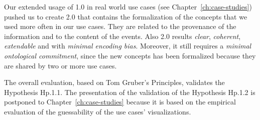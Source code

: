 Our extended usage of \frappe{} 1.0 in real world use cases (see Chapter~\ref{ch:case-studies}) pushed us to create \frappe{} 2.0 that contains the formalization of the concepts that we used more often in our use cases.
They are related to the provenance of the information and to the content of the events.
Also \frappe{} 2.0 results \textit{clear}, \textit{coherent}, \textit{extendable} and with \textit{minimal encoding bias}.
Moreover, it still requires a \textit{minimal ontological commitment}, since the new concepts has been formalized because they are shared by two or more use cases.

The overall evaluation, based on Tom Gruber's Principles, validates the Hypothesis \textsf{Hp.1.1}.
The presentation of the validation of the Hypothesis \textsf{Hp.1.2} is postponed to Chapter~\ref{ch:case-studies} because it is based on the empirical evaluation of the guessability of the use cases' visualizations.